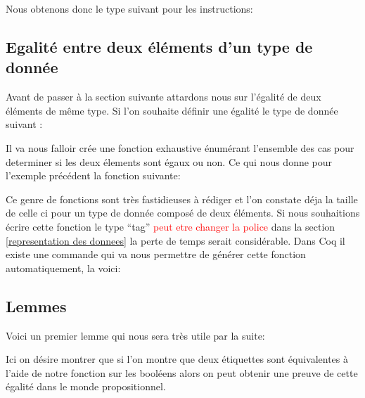 \documentclass {article}
\newcommand{\codefrom}[3]
           {}
\theoremstyle{definition}
\theoremstyle{remark}
\newcommand{\todo}[1]{\textcolor{red}{#1}}
\begin{document}
Nous obtenons donc le type suivant pour les instructions:
\codefrom{src}{ast_instructions}{instruction}






\subsection{Egalité entre deux éléments d'un type de donnée}
Avant de passer à la section suivante attardons nous sur l'égalité de deux éléments de même type.
Si l'on souhaite définir une égalité le type de donnée suivant :
\codefrom{rapport}{definitions}{example_type}

Il va nous falloir crée une fonction exhaustive énumérant l'ensemble des cas pour determiner
si les deux élements sont égaux ou non. Ce qui nous donne pour l'exemple précédent la fonction suivante:

\codefrom{rapport}{definitions}{equal}

Ce genre de fonctions sont très fastidieuses à rédiger et l'on constate déja la taille de celle ci
pour un type de donnée composé de deux éléments.
Si nous souhaitions écrire cette fonction le type ``tag'' \todo{peut etre changer la police} dans
la section \ref{representation des donnees} la perte de temps serait considérable.
Dans Coq il existe une commande qui va nous permettre de générer cette fonction
automatiquement, la voici:

\codefrom{rapport}{definitions}{SchemeEqual}



\subsection{Lemmes}
Voici un premier lemme qui nous sera très utile par la suite:
\codefrom{src}{ast_instructions}{tag_beq_different}
Ici on désire montrer que si l'on montre que deux étiquettes sont équivalentes
à l'aide de notre fonction sur les booléens alors on peut obtenir une preuve
de cette égalité dans le monde propositionnel.












\end{document}
